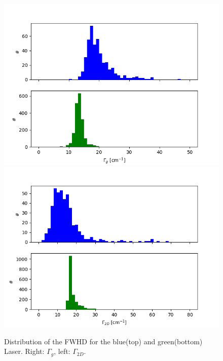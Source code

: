 \documentclass[12pt,a4paper]{article}
\begin{document}
\begin{figure}
\centering
\includegraphics[scale=0.5]{Bilder/Laser/gammag_hist.png}
\includegraphics[scale=0.5]{Bilder/Laser/gamma2d_hist.png}
\caption{Distribution of the FWHD for the blue(top) and green(bottom) Laser. Right: $\Gamma_{g}$, left: $\Gamma_{2D}$.}
\label{fig:Laser_gamma_hist}
\end{figure}
\end{document}
